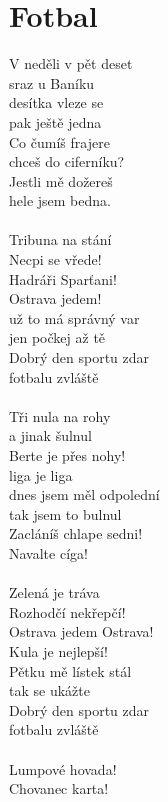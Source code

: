 \section{Fotbal}
\begin{multicols}{2}
V neděli v pět deset\\
sraz u Baníku\\
desítka vleze se\\
pak ještě jedna\\
Co čumíš frajere\\
chceš do ciferníku?\\
Jestli mě dožereš\\
hele jsem bedna.\\
\\
Tribuna na stání\\
Necpi se vřede!\\
Hadráři Sparťani!\\
Ostrava jedem!\\
už to má správný var\\
jen počkej až tě\\
Dobrý den sportu zdar\\
fotbalu zvláště\\
\\
Tři nula na rohy\\
a jinak šulnul\\
Berte je přes nohy!\\
liga je liga\\
dnes jsem měl odpolední\\
tak jsem to bulnul\\
Zacláníš chlape sedni!\\
Navalte cíga!\\
\columnbreak
\\
Zelená je tráva\\
Rozhodčí nekřepčí!\\
Ostrava jedem Ostrava!\\
Kula je nejlepší!\\
Pětku mě lístek stál\\
tak se ukážte\\
Dobrý den sportu zdar\\
fotbalu zvláště\\
\\
Lumpové hovada!\\
Chovanec karta!\\

\end{multicols}
